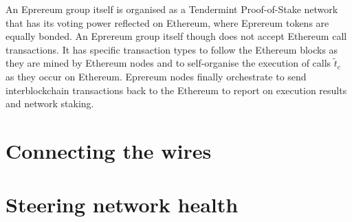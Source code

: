 \documentclass[twocolumn]{article}
\begin{document}
An Eprereum group itself is organised as a Tendermint Proof-of-Stake network that has its voting power reflected on Ethereum, where Eprereum tokens are equally bonded.  An Eprereum group itself though does not accept Ethereum call transactions.  It has specific transaction types to follow the Ethereum blocks as they are mined by Ethereum nodes and to self-organise the execution of calls $\tilde{t}_c$ as they occur on Ethereum. Eprereum nodes finally orchestrate to send interblockchain transactions back to the Ethereum to report on execution results and network staking.


\section{Connecting the wires}
\section{Steering network health}


\end{document}
